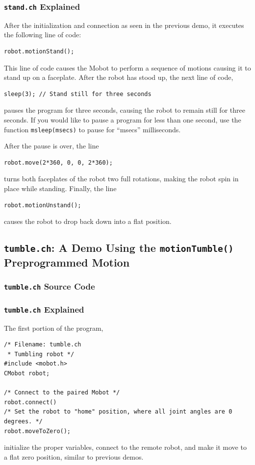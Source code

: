 \documentclass{article}
\begin{document}
\subsubsection{\texttt{stand.ch} Explained}
After the initialization and 
connection as seen in the previous demo, it executes the following line of
code:
\begin{verbatim}
robot.motionStand();
\end{verbatim}
This line of code causes the Mobot to perform a sequence of motions causing it to
stand up on a faceplate. After the robot has stood up, the next line of code,
\begin{verbatim}
sleep(3); // Stand still for three seconds
\end{verbatim}
pauses the program for three seconds, causing the robot to remain still for three
seconds. If you would like to pause a program for less than one second, use the 
function \texttt{msleep(msecs)} to pause for ``msecs'' milliseconds.

After the pause is over, the line
\begin{verbatim}
robot.move(2*360, 0, 0, 2*360);
\end{verbatim}
turns both faceplates of the robot two full rotations, making the robot spin in place
while standing. Finally, the line
\begin{verbatim}
robot.motionUnstand();
\end{verbatim}
causes the robot to drop back down into a flat position.

\subsection{\texttt{tumble.ch}: A Demo Using the \texttt{motionTumble()} Preprogrammed
Motion}
\subsubsection{\texttt{tumble.ch} Source Code}

\subsubsection{\texttt{tumble.ch} Explained}
The first portion of the program,
\begin{verbatim}
/* Filename: tumble.ch 
 * Tumbling robot */
#include <mobot.h>
CMobot robot;

/* Connect to the paired Mobot */
robot.connect()
/* Set the robot to "home" position, where all joint angles are 0 degrees. */
robot.moveToZero();
\end{verbatim}
initialize the proper variables, connect to the remote robot, and make it move
to a flat zero position, similar to previous demos.
\end{document}
